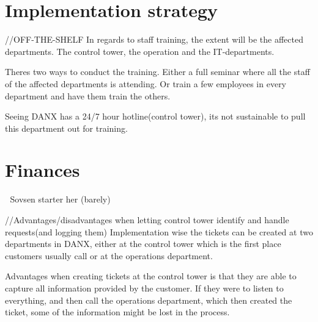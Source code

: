 \section{Implementation strategy}
//OFF-THE-SHELF
In regards to staff training, the extent will be the affected departments. The control tower, the operation and the IT-departments.

Theres two ways to conduct the training. Either a full seminar where all the staff of the affected departments is attending.
Or train a few employees in every department and have them train the others.

Seeing DANX has a 24/7 hour hotline(control tower), its not sustainable to pull this department out for training.


\section{Finances}


Sovsen starter her (barely)

//Advantages/disadvantages when letting control tower identify and handle requests(and logging them)
Implementation wise the tickets can be created at two departments in DANX, either at the control tower which is the first place customers usually call or at the operations department.

Advantages when creating tickets at the control tower is that they are able to capture all information provided by the customer. If they were to listen to everything, and then call the operations department, which then created the ticket, some of the information might be lost in the process.
